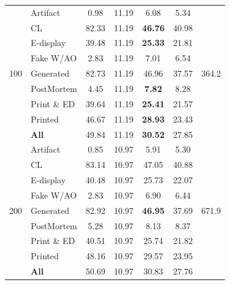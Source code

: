\begin{table}[!htbp]
\begin{tabular}{l l c c c c c}
\multirow{9}{*}{100}
& Artifact       &   0.98 &  11.19 &                 6.08 &    5.34 & \multirow{9}{*}{364.2} \\
& CL             &  82.33 &  11.19 &       \textbf{46.76} &   40.98 &  \\
& E-display      &  39.48 &  11.19 &       \textbf{25.33} &   21.81 &  \\
& Fake W/AO      &   2.83 &  11.19 &                 7.01 &    6.54 &  \\
& Generated      &  82.73 &  11.19 &                46.96 &   37.57 &  \\
& PostMortem     &   4.45 &  11.19 &        \textbf{7.82} &    8.28 &  \\
& Print \& ED    &  39.64 &  11.19 &       \textbf{25.41} &   21.57 &  \\
& Printed        &  46.67 &  11.19 &       \textbf{28.93} &   23.43 &  \\
& \textbf{All} &  49.84 &  11.19 &       \textbf{30.52} &   27.85 & \\
\midrule

\multirow{9}{*}{200}
& Artifact       &   0.85 &  10.97 &                 5.91 &    5.30 & \multirow{9}{*}{671.9} \\
& CL             &  83.14 &  10.97 &                47.05 &   40.88 &  \\
& E-display      &  40.48 &  10.97 &                25.73 &   22.07 &  \\
& Fake W/AO      &   2.83 &  10.97 &                 6.90 &    6.44 &  \\
& Generated      &  82.92 &  10.97 &       \textbf{46.95} &   37.69 &  \\
& PostMortem     &   5.28 &  10.97 &                 8.13 &    8.37 &  \\
& Print \& ED    &  40.51 &  10.97 &                25.74 &   21.82 &  \\
& Printed        &  48.16 &  10.97 &                29.57 &   23.95 &  \\
& \textbf{All} &  50.69 &  10.97 &                30.83 &   27.76 & \\

\bottomrule
\end{tabular}
\end{table}